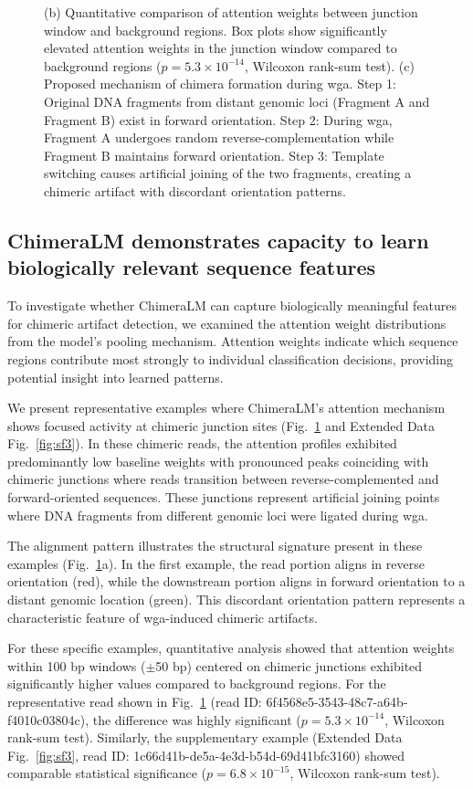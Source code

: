 \documentclass[pdflatex,sn-nature]{sn-jnl}%
\theoremstyle{thmstyleone}%
\theoremstyle{thmstyletwo}%
\theoremstyle{thmstylethree}%
\begin{document}
\begin{figure}[!ht]
{		(b) Quantitative comparison of attention weights between junction window and background regions. Box plots show significantly elevated attention weights in the junction window compared to background regions ($p = 5.3 \times 10^{-14}$, Wilcoxon rank-sum test).
		(c) Proposed mechanism of chimera formation during \gls{wga}. Step 1: Original DNA fragments from distant genomic loci (Fragment A and Fragment B) exist in forward orientation. Step 2: During \gls{wga}, Fragment A undergoes random reverse-complementation while Fragment B maintains forward orientation. Step 3: Template switching causes artificial joining of the two fragments, creating a chimeric artifact with discordant orientation patterns.}\label{fig:figure4}
\end{figure}

\subsection*{ChimeraLM demonstrates capacity to learn biologically relevant sequence features}

To investigate whether ChimeraLM can capture biologically meaningful features for chimeric artifact detection, we examined the attention weight distributions from the model's pooling mechanism.
Attention weights indicate which sequence regions contribute most strongly to individual classification decisions, providing potential insight into learned patterns.

We present representative examples where ChimeraLM's attention mechanism shows focused activity at chimeric junction sites (Fig.~\ref{fig:figure4} and Extended Data Fig.~\ref{fig:sf3}).
In these chimeric reads, the attention profiles exhibited predominantly low baseline weights with pronounced peaks coinciding with chimeric junctions where reads transition between reverse-complemented and forward-oriented sequences.
These junctions represent artificial joining points where DNA fragments from different genomic loci were ligated during \gls{wga}.

The alignment pattern illustrates the structural signature present in these examples (Fig.~\ref{fig:figure4}a).
In the first example, the read portion aligns in reverse orientation (red), while the downstream portion aligns in forward orientation to a distant genomic location (green).
This discordant orientation pattern represents a characteristic feature of \gls{wga}-induced chimeric artifacts.

For these specific examples, quantitative analysis showed that attention weights within 100 bp windows ($\pm$50 bp) centered on chimeric junctions exhibited significantly higher values compared to background regions.
For the representative read shown in Fig.~\ref{fig:figure4} (read ID: 6f4568e5-3543-48c7-a64b-f4010c03804c), the difference was highly significant ($p = 5.3 \times 10^{-14}$, Wilcoxon rank-sum test).
Similarly, the supplementary example (Extended Data Fig.~\ref{fig:sf3}, read ID: 1c66d41b-de5a-4e3d-b54d-69d41bfc3160) showed comparable statistical significance ($p = 6.8 \times 10^{-15}$, Wilcoxon rank-sum test).
\end{document}
